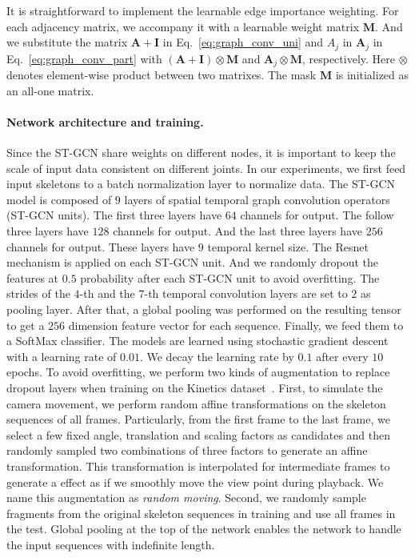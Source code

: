 \documentclass[letterpaper]{article} %
\begin{document}
It is straightforward to implement the learnable edge importance weighting. 
For each adjacency matrix, we accompany it with a learnable weight matrix $ \mathbf{M} $.
And we substitute the matrix $ \mathbf{A} + \mathbf{I} $ in Eq.~\ref{eq:graph_conv_uni} and $ {A}_j $ in $ \mathbf{A}_j $ in Eq.~\ref{eq:graph_conv_part} with $(\mathbf{A} + \mathbf{I})\otimes\mathbf{M}$ and $ \mathbf{A}_j\otimes \mathbf{M} $, respectively. 
Here $ \otimes $ denotes element-wise product between two matrixes.
The mask $ \mathbf{M} $ is initialized as an all-one matrix. 

\paragraph{Network architecture and training.}
Since the ST-GCN share weights on different nodes, it is important to keep the scale of input data consistent on different joints. 
In our experiments, we first feed input skeletons to a batch normalization layer to normalize data.   
The ST-GCN model is composed of $9$ layers of spatial temporal graph convolution operators (ST-GCN units). 
The first three layers have $ 64 $ channels for output. 
The follow three layers have $128$ channels for output.
And the last three layers have $256$ channels for output.
These layers have $ 9 $ temporal kernel size.
The Resnet mechanism is applied on each ST-GCN unit.
And we randomly dropout the features at $0.5$ probability after each ST-GCN unit to avoid overfitting. 
The strides of the $4$-th and the $7$-th temporal convolution layers are set to $2$ as
pooling layer.
After that, a global pooling was performed on the resulting tensor to get a $ 256 $ dimension feature vector for each sequence. 
Finally, we feed them to a SoftMax classifier.
The models are learned using stochastic gradient descent with a learning rate of $ 0.01 $. We decay the learning rate by $ 0.1 $ after every $ 10 $ epochs.
To avoid overfitting, we perform two kinds of augmentation to replace dropout layers when training on the Kinetics dataset~\cite{Kay2017Kinetics}.
First, to simulate the camera movement, we perform random affine transformations on the skeleton sequences of all frames. 
Particularly, from  the first frame to the last frame, we select a few fixed angle, translation and scaling factors as candidates 
and then randomly
sampled two combinations of three factors to generate an affine transformation. 
This transformation is interpolated for intermediate frames to generate a effect as if we smoothly move the view point during playback.
We name this augmentation as \emph{random moving}.
Second, we randomly sample fragments from the original skeleton sequences in training and use all frames in the test. 
Global pooling at the top of the network enables the network to handle the input sequences with indefinite length.
\end{document}
